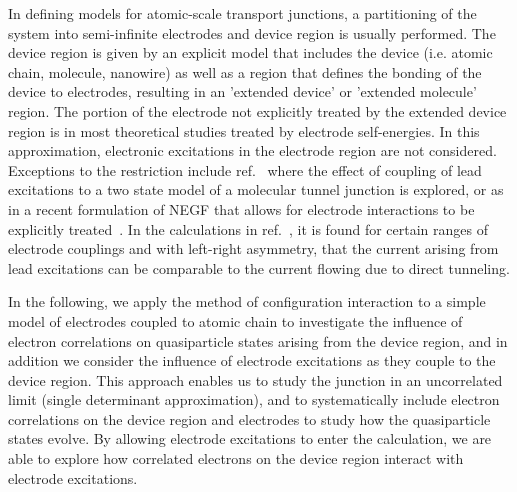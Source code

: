 In defining models for atomic-scale transport junctions, a partitioning
of the system into semi-infinite electrodes and device region is usually
performed. The device region is given by an explicit model that includes
the device (i.e. atomic chain, molecule, nanowire) as well as a region
that defines the bonding of the device to electrodes, resulting in an
'extended device' or 'extended molecule' region. The portion of the
electrode not explicitly treated by the extended device region is in
most theoretical studies treated by electrode self-energies. In this
approximation, electronic excitations in the electrode region are not
considered. Exceptions to the restriction include
ref.~\cite{galperin_nitzan2006leadexcitations} where the effect of coupling
of lead excitations to a two state model of a molecular tunnel junction is
explored, or as in a recent formulation of \ac{NEGF} that allows for
electrode interactions to be explicitly treated~\cite{ness2012jpa_leadnegf}.
In the calculations in ref.~\cite{galperin_nitzan2006leadexcitations}, it is
found for certain ranges of electrode couplings and with left-right asymmetry,
that the current arising from lead excitations can be comparable to the
current flowing due to direct tunneling.

In the following, we apply the method of configuration interaction to a
simple model of electrodes coupled to atomic chain to investigate the
influence of electron correlations on quasiparticle states arising from
the device region, and in addition we consider the influence of electrode
excitations as they couple to the device region. This approach enables
us to study the junction in an uncorrelated limit (single determinant
approximation), and to systematically include electron correlations on
the device region and electrodes to study how the quasiparticle states
evolve. By allowing electrode excitations to enter the calculation, we
are able to explore how correlated electrons on the device region
interact with electrode excitations.

% 

